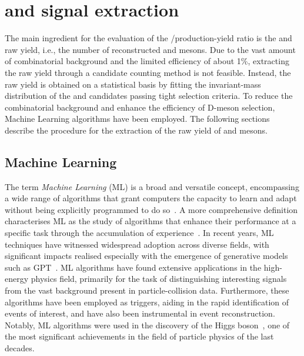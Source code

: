 \chapter{\texorpdfstring{\ds and \dpl signal extraction}{Ds+ and D+ signal extraction}}

The main ingredient for the evaluation of the \ds/\dpl production-yield ratio is the \ds and \dpl raw yield, i.e., the number of reconstructed \ds and \dpl mesons. Due to the vast amount of combinatorial background and the limited efficiency of about 1\%, extracting the raw yield through a candidate counting method is not feasible. Instead, the raw yield is obtained on a statistical basis by fitting the invariant-mass distribution of the \ds and \dpl candidates passing tight selection criteria. To reduce the combinatorial background and enhance the efficiency of D-meson selection, Machine Learning algorithms have been employed. The following sections describe the procedure for the extraction of the raw yield of \ds and \dpl mesons. 


\section{Machine Learning}
The term \emph{Machine Learning} (ML) is a broad and versatile concept, encompassing a wide range of algorithms that grant computers the capacity to learn and adapt without being explicitly programmed to do so~\cite{5392560}. A more comprehensive definition characterises ML as the study of algorithms that enhance their performance at a specific task through the accumulation of experience~\cite{mitchell1997machine}. In recent years, ML techniques have witnessed widespread adoption across diverse fields, with significant impacts realised especially with the emergence of generative models such as GPT~\cite{openai2023gpt4}. ML algorithms have found extensive applications in the high-energy physics field, primarily for the task of distinguishing interesting signals from the vast background present in particle-collision data. Furthermore, these algorithms have been employed as triggers, aiding in the rapid identification of events of interest, and have also been instrumental in event reconstruction. Notably, ML algorithms were used in the discovery of the Higgs boson~\cite{CMS:2012qbp}, one of the most significant achievements in the field of particle physics of the last decades.



